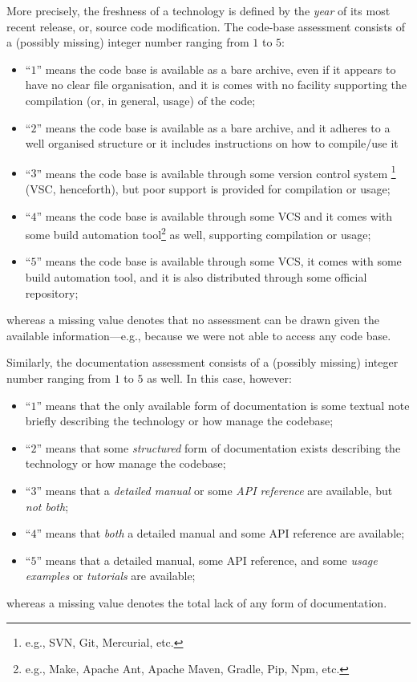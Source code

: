 \documentclass[12pt,a4paper,openright,twoside]{book}
\begin{document}
More precisely, the freshness of a technology is defined by the \emph{year} of its most recent release, or, source code modification.
%
The code-base assessment consists of a (possibly missing) integer number ranging from $1$ to $5$:
%
\begin{itemize}
    \item ``$1$'' means the code base is available as a bare archive, even if it appears to have no clear file organisation, and it is comes with no facility supporting the compilation (or, in general, usage) of the code;
    \item ``$2$'' means the code base is available as a bare archive, and it adheres to a well organised structure or it includes instructions on how to compile/use it
    \item ``$3$'' means the code base is available through some version control system \footnote{e.g., SVN, Git, Mercurial, etc.} (VSC, henceforth), but poor support is provided for compilation or usage;
    \item ``$4$'' means the code base is available through some VCS and it comes with some build automation tool\footnote{e.g., Make, Apache Ant, Apache Maven, Gradle, Pip, Npm, etc.} as well, supporting compilation or usage;
    \item ``$5$'' means the code base is available through some VCS, it comes with some build automation tool, and it is also distributed through some official repository;
\end{itemize}
%
whereas a missing value denotes that no assessment can be drawn given the available information---e.g., because we were not able to access any code base.

Similarly, the documentation assessment consists of a (possibly missing) integer number ranging from $1$ to $5$ as well.
%
In this case, however:
%
\begin{itemize}
    \item ``$1$'' means that the only available form of documentation is some textual note briefly describing the technology or how manage the codebase;
    \item ``$2$'' means that some \emph{structured} form of documentation exists describing the technology or how manage the codebase;
    \item ``$3$'' means that a \emph{detailed manual} or some \emph{API reference} are available, but \emph{not both};
    \item ``$4$'' means that \emph{both} a detailed manual and some API reference are available;
    \item ``$5$'' means that a detailed manual, some API reference, and some \emph{usage examples} or \emph{tutorials} are available;
\end{itemize}
%
whereas a missing value denotes the total lack of any form of documentation.
\end{document}
